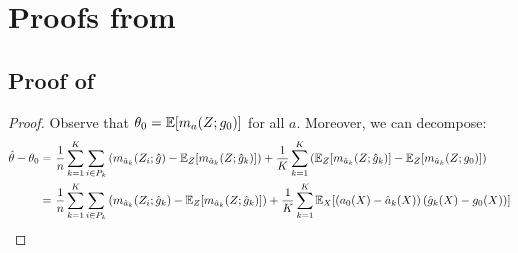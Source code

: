 
\section{Proofs from }

\subsection{Proof of }
\begin{proof}
Observe that $\theta_0 = \mathbb{E}[m_{a}(Z; g_0)]$ for all $a$. Moreover, we can decompose:
\begin{align}
    \hat{\theta}-\theta_0 =~& \frac{1}{n} \sum_{k=1}^K \sum_{i\in P_k} \left(m_{\hat{a}_k}(Z_i; \hat{g}) - \mathbb{E}_Z[m_{\hat{a}_k}(Z; \hat{g}_k)]\right) + \frac{1}{K} \sum_{k=1}^K \left(\mathbb{E}_Z[m_{\hat{a}_k}(Z; \hat{g}_k)] - \mathbb{E}_Z[m_{\hat{a}_k}(Z; g_0)]\right)\\
    =~& \frac{1}{n} \sum_{k=1}^K \sum_{i\in P_k} \left(m_{\hat{a}_k}(Z_i; \hat{g}_k) - \mathbb{E}_Z[m_{\hat{a}_k}(Z; \hat{g}_k)]\right) + \frac{1}{K} \sum_{k=1}^K \mathbb{E}_X[(a_0(X) - \hat{a}_k(X))\, (\hat{g}_k(X) - g_0(X))]
\end{align}


\end{proof}
